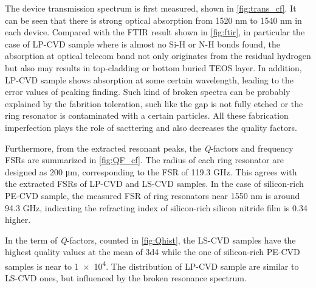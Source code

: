 The device transmission spectrum is first measured, shown in \autoref{fig:trans_cf}. It can be seen that there is strong optical absorption from 1520 nm to 1540 nm in each device. Compared with the FTIR result shown in \autoref{fig:ftir}, in particular the case of LP-CVD sample where is almost no Si-H or N-H bonds found, the absorption at optical telecom band not only originates from the residual hydrogen but also may results in top-cladding or bottom buried TEOS layer.
In addition, LP-CVD sample shows absorption at some certain wavelength, leading to the error values of peaking finding. Such kind of broken spectra can be probably explained by the fabrition toleration, such like the gap is not fully etched or the ring resonator is contaminated with a certain particles. All these fabrication imperfection plays the role of sacttering and also decreases the quality factors.

Furthermore, from the extracted resonant peaks, the \textit{Q}-factors and frequency FSRs are summarized in \autoref{fig:QF_cf}. The radius of each ring resonator are designed as 200 \si{\um}, corresponding to the FSR of 119.3 GHz. This agrees with the extracted FSRs of LP-CVD and LS-CVD samples. In the case of silicon-rich PE-CVD sample, the measured FSR of ring resonators near 1550 nm is around 94.3 GHz, indicating the refracting index of silicon-rich silicon nitride film is 0.34 higher.

In the term of \textit{Q}-factors, counted in \autoref{fig:Qhist}, the LS-CVD samples have the highest quality values at the mean of \num{3d4} while the one of silicon-rich PE-CVD samples is near to \num{1e4}. The distribution of LP-CVD sample are similar to LS-CVD ones, but influenced by the broken resonance spectrum.

\begin{figure}
	\centering
	
	\label{fig:trans_cf}
\end{figure}

\begin{figure}
	\centering
	
	\label{fig:QF_cf}
\end{figure}

\begin{figure}
	\centering
	
	\label{fig:Qhist}
\end{figure}

